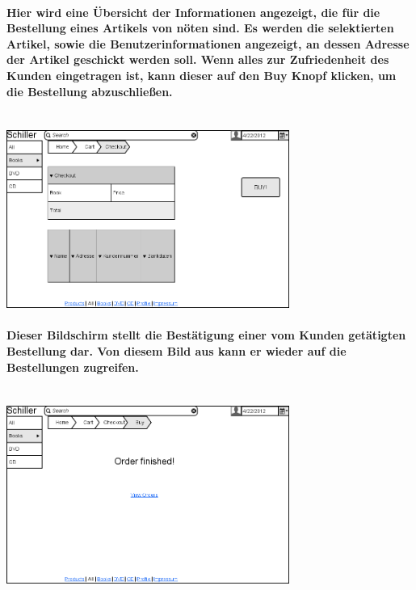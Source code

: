 \documentclass[a4paper]{article}
\begin{document}
\paragraph{Hier wird eine Übersicht der Informationen angezeigt, die für die Bestellung eines Artikels von nöten sind. Es werden die selektierten Artikel, sowie die Benutzerinformationen angezeigt, an dessen Adresse der Artikel geschickt werden soll. Wenn alles zur Zufriedenheit des Kunden eingetragen ist, kann dieser auf den Buy Knopf klicken, um die Bestellung abzuschließen.\\ \\}
\includegraphics[width=350px]{9CheckOut.png}

\paragraph{Dieser Bildschirm stellt die Bestätigung einer vom Kunden getätigten Bestellung dar. Von diesem Bild aus kann er wieder auf die Bestellungen zugreifen.\\ \\}
\includegraphics[width=350px]{10SuccessfullyOrdered.png}
\end{document}
